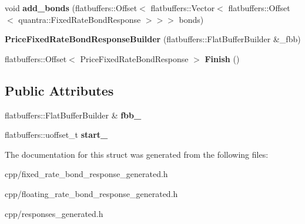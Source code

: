 \begin{DoxyCompactItemize}
void {\bfseries add\+\_\+bonds} (flatbuffers\+::\+Offset$<$ flatbuffers\+::\+Vector$<$ flatbuffers\+::\+Offset$<$ quantra\+::\+Fixed\+Rate\+Bond\+Response $>$$>$$>$ bonds)
\item 
\mbox{\label{structquantra_1_1PriceFixedRateBondResponseBuilder_a880757fff5dd2b5b6dce35235a5a254b}} 
{\bfseries Price\+Fixed\+Rate\+Bond\+Response\+Builder} (flatbuffers\+::\+Flat\+Buffer\+Builder \&\+\_\+fbb)
\item 
\mbox{\label{structquantra_1_1PriceFixedRateBondResponseBuilder_a2f8966503cd2869044470fb17d9aa561}} 
flatbuffers\+::\+Offset$<$ Price\+Fixed\+Rate\+Bond\+Response $>$ {\bfseries Finish} ()
\end{DoxyCompactItemize}
\subsection*{Public Attributes}
\begin{DoxyCompactItemize}
\item 
\mbox{\label{structquantra_1_1PriceFixedRateBondResponseBuilder_aab7b645a6c943ee4d71ef59aa017c04c}} 
flatbuffers\+::\+Flat\+Buffer\+Builder \& {\bfseries fbb\+\_\+}
\item 
\mbox{\label{structquantra_1_1PriceFixedRateBondResponseBuilder_a73582ad75ea949c5912a3e3fd67ba115}} 
flatbuffers\+::uoffset\+\_\+t {\bfseries start\+\_\+}
\end{DoxyCompactItemize}


The documentation for this struct was generated from the following files\+:\begin{DoxyCompactItemize}
\item 
cpp/fixed\+\_\+rate\+\_\+bond\+\_\+response\+\_\+generated.\+h\item 
cpp/floating\+\_\+rate\+\_\+bond\+\_\+response\+\_\+generated.\+h\item 
cpp/responses\+\_\+generated.\+h\end{DoxyCompactItemize}
